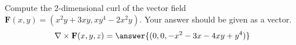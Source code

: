 \begin{problem}
Compute the 2-dimensional curl of the vector field $\mathbf{F}(x,y) = (x^2y+3xy,xy^4-2x^2y)$. Your answer should be given as a vector.
\[
\nabla\times\mathbf{F}(x,y,z) = \answer{(0,0,-x^2-3x-4xy+y^4)}
\]
\end{problem}
